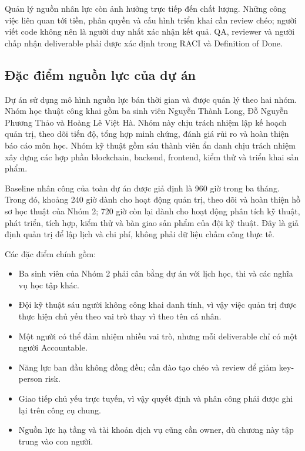 Quản lý nguồn nhân lực còn ảnh hưởng trực tiếp đến chất lượng. Những công việc liên quan tới tiền, phân quyền và cấu hình triển khai cần review chéo; người viết code không nên là người duy nhất xác nhận kết quả. QA, reviewer và người chấp nhận deliverable phải được xác định trong RACI và Definition of Done.

\subsection{Đặc điểm nguồn lực của dự án}

Dự án sử dụng mô hình nguồn lực bán thời gian và được quản lý theo hai nhóm. Nhóm học thuật công khai gồm ba sinh viên Nguyễn Thành Long, Đỗ Nguyễn Phương Thảo và Hoàng Lê Việt Hà. Nhóm này chịu trách nhiệm lập kế hoạch quản trị, theo dõi tiến độ, tổng hợp minh chứng, đánh giá rủi ro và hoàn thiện báo cáo môn học. Nhóm kỹ thuật gồm sáu thành viên ẩn danh chịu trách nhiệm xây dựng các hợp phần blockchain, backend, frontend, kiểm thử và triển khai sản phẩm.

Baseline nhân công của toàn dự án được giả định là 960 giờ trong ba tháng. Trong đó, khoảng 240 giờ dành cho hoạt động quản trị, theo dõi và hoàn thiện hồ sơ học thuật của Nhóm 2; 720 giờ còn lại dành cho hoạt động phân tích kỹ thuật, phát triển, tích hợp, kiểm thử và bàn giao sản phẩm của đội kỹ thuật. Đây là giả định quản trị để lập lịch và chi phí, không phải dữ liệu chấm công thực tế.

Các đặc điểm chính gồm:

\begin{itemize}
  \item Ba sinh viên của Nhóm 2 phải cân bằng dự án với lịch học, thi và các nghĩa vụ học tập khác.
  \item Đội kỹ thuật sáu người không công khai danh tính, vì vậy việc quản trị được thực hiện chủ yếu theo vai trò thay vì theo tên cá nhân.
  \item Một người có thể đảm nhiệm nhiều vai trò, nhưng mỗi deliverable chỉ có một người Accountable.
  \item Năng lực ban đầu không đồng đều; cần đào tạo chéo và review để giảm key-person risk.
  \item Giao tiếp chủ yếu trực tuyến, vì vậy quyết định và phân công phải được ghi lại trên công cụ chung.
  \item Nguồn lực hạ tầng và tài khoản dịch vụ cũng cần owner, dù chương này tập trung vào con người.
\end{itemize}


